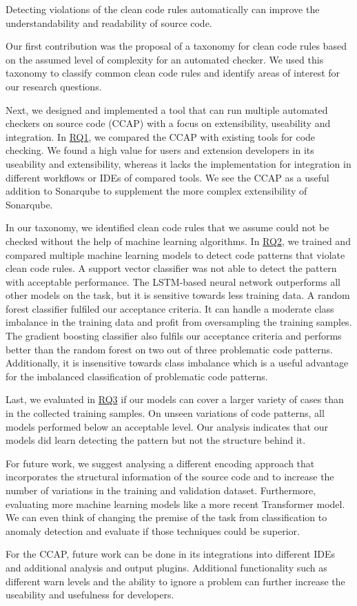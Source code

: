 

Detecting violations of the clean code rules automatically can improve the understandability and readability of source code. 

Our first contribution was the proposal of a taxonomy for clean code rules based on the assumed level of complexity for an automated checker.
We used this taxonomy to classify common clean code rules and identify areas of interest for our research questions.

Next, we designed and implemented a tool that can run multiple automated checkers on source code (CCAP) with a focus on extensibility, useability and integration. In \hyperref[rq:1]{RQ1}, we compared the CCAP with existing tools for code checking. We found a high value for users and extension developers in its useability and extensibility, whereas it lacks the implementation for integration in different workflows or IDEs of compared tools. We see the CCAP as a useful addition to Sonarqube to supplement the more complex extensibility of Sonarqube.

In our taxonomy, we identified clean code rules that we assume could not be checked without the help of machine learning algorithms. In \hyperref[rq:2]{RQ2}, we trained and compared multiple machine learning models to detect code patterns that violate clean code rules. A support vector classifier was not able to detect the pattern with acceptable performance. The LSTM-based neural network outperforms all other models on the task, but it is sensitive towards less training data.
A random forest classifier fulfiled our acceptance criteria. It can handle a moderate class imbalance in the training data and profit from oversampling the training samples. The gradient boosting classifier also fulfils our acceptance criteria and performs better than the random forest on two out of three problematic code patterns. Additionally, it is insensitive towards class imbalance which is a useful advantage for the imbalanced classification of problematic code patterns.

Last, we evaluated in \hyperref[rq:3]{RQ3} if our models can cover a larger variety of cases than in the collected training samples. On unseen variations of code patterns, all models performed below an acceptable level. Our analysis indicates that our models did learn detecting the pattern but not the structure behind it.

\medskip
For future work, we suggest analysing a different encoding approach that incorporates the structural information of the source code and to increase the number of variations in the training and validation dataset. Furthermore, evaluating more machine learning models like a more recent Transformer model. We can even think of changing the premise of the task from classification to anomaly detection and evaluate if those techniques could be superior.

For the CCAP, future work can be done in its integrations into different IDEs and additional analysis and output plugins. Additional functionality such as different warn levels and the ability to ignore a problem can further increase the useability and usefulness for developers.





